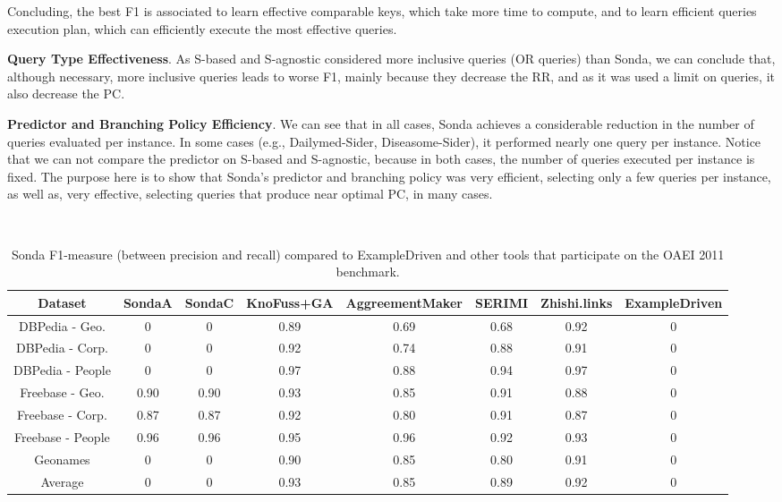 Concluding, the best F1 is associated to learn effective comparable keys, which take more time to compute, and to learn efficient queries execution plan, which can efficiently execute the most effective queries. 
 
\textbf{Query Type Effectiveness}. As S-based and S-agnostic considered more inclusive queries (OR queries) than Sonda, we can conclude that, although necessary, more inclusive queries leads to worse F1, mainly because they decrease the RR, and as it was used a limit on queries, it also decrease the PC. 

\textbf{Predictor and Branching Policy Efficiency}. We can see that in all cases, Sonda achieves a considerable reduction in the number of queries evaluated per instance. In some cases (e.g., Dailymed-Sider, Diseasome-Sider), it performed nearly one query per instance. Notice that we can not compare the predictor on S-based and S-agnostic, because in both cases, the number of queries executed per instance is fixed. The purpose here is to show  that Sonda's predictor and branching policy was very efficient, selecting only a few queries per instance, as well as, very effective, selecting queries that produce near optimal PC, in many cases. 


\begin{center}
\begin{table*}[h]
\centering
\scriptsize\tt
\caption{Sonda F1-measure (between precision and recall) compared to ExampleDriven and other tools that participate on the OAEI 2011 benchmark.} 
\begin{tabular}{|c|c|c|c|c|c|c|c|}
\hline
Dataset  &  SondaA  &  SondaC & KnoFuss+GA & AggreementMaker & SERIMI & Zhishi.links & ExampleDriven\\ \hline
DBPedia - Geo. & 0 & 0  & 0.89 & 0.69 & 0.68 & 0.92 & 0 \\ \hline
DBPedia - Corp. & 0& 0 & 0.92 & 0.74 & 0.88 & 0.91 & 0\\ \hline
DBPedia - People & 0 & 0 & 0.97 & 0.88 & 0.94 & 0.97 & 0\\ \hline
Freebase - Geo. & 0.90 & 0.90 & 0.93 & 0.85 & 0.91 & 0.88 & 0\\ \hline
Freebase - Corp. & 0.87 & 0.87 & 0.92 & 0.80 & 0.91 & 0.87 & 0\\ \hline
Freebase - People & 0.96 &  0.96 & 0.95 & 0.96 & 0.92 & 0.93 & 0\\ \hline
Geonames & 0 & 0  & 0.90 & 0.85 & 0.80 & 0.91 & 0\\ \hline
Average & 0 & 0  & 0.93 & 0.85 & 0.89 &  0.92 & 0\\ \hline											 
\end{tabular}  
\end{table*} 
\end{center}

